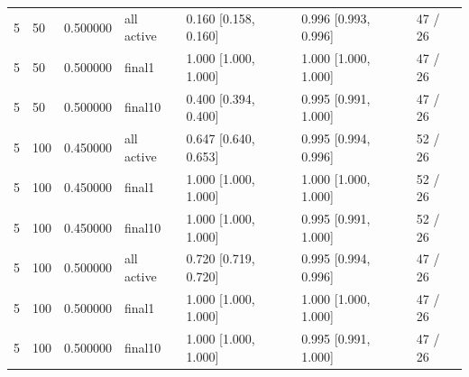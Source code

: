 \begin{table}[t]
{\begin{tabular}{lllllll}
5 & 50 & 0.500000 & all active & 0.160 [0.158, 0.160] & 0.996 [0.993, 0.996] & 47 / 26 \\
5 & 50 & 0.500000 & final1 & 1.000 [1.000, 1.000] & 1.000 [1.000, 1.000] & 47 / 26 \\
5 & 50 & 0.500000 & final10 & 0.400 [0.394, 0.400] & 0.995 [0.991, 1.000] & 47 / 26 \\
5 & 100 & 0.450000 & all active & 0.647 [0.640, 0.653] & 0.995 [0.994, 0.996] & 52 / 26 \\
5 & 100 & 0.450000 & final1 & 1.000 [1.000, 1.000] & 1.000 [1.000, 1.000] & 52 / 26 \\
5 & 100 & 0.450000 & final10 & 1.000 [1.000, 1.000] & 0.995 [0.991, 1.000] & 52 / 26 \\
5 & 100 & 0.500000 & all active & 0.720 [0.719, 0.720] & 0.995 [0.994, 0.996] & 47 / 26 \\
5 & 100 & 0.500000 & final1 & 1.000 [1.000, 1.000] & 1.000 [1.000, 1.000] & 47 / 26 \\
5 & 100 & 0.500000 & final10 & 1.000 [1.000, 1.000] & 0.995 [0.991, 1.000] & 47 / 26 \\
\bottomrule
\end{tabular}
}
\end{table}
